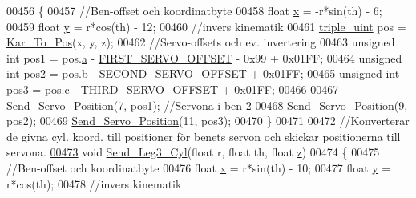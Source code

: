 \begin{DoxyCode}
00456 \{
00457     \textcolor{comment}{//Ben-offset och koordinatbyte}
00458     \textcolor{keywordtype}{float} \hyperlink{sensor_8h_a6c4b361d72eb3767ba424ac9a6ecf52b}{x} = -r*sin(th) - 6;
00459     \textcolor{keywordtype}{float} \hyperlink{sensor_8h_a0ed6a908288e0cd87f79c1b5ab56d07c}{y} = r*cos(th) - 12; 
00460     \textcolor{comment}{//invers kinematik }
00461     \hyperlink{structtriple__uint}{triple\_uint} pos = \hyperlink{invers__kinematik_8c_a68f82386196ad991ed54fb9796d90f7c}{Kar\_To\_Pos}(x, y, z);
00462     \textcolor{comment}{//Servo-offsets och ev. invertering }
00463     \textcolor{keywordtype}{unsigned} \textcolor{keywordtype}{int} pos1 = pos.\hyperlink{structtriple__uint_a0ea8a85723620c90be9fd2a693f12a59}{a} - \hyperlink{servo___u_a_r_t_8c_a4c437d01d2f060ec86c16ed5e76efe45}{FIRST\_SERVO\_OFFSET} - 0x99 + 0x01FF;
00464     \textcolor{keywordtype}{unsigned} \textcolor{keywordtype}{int} pos2 = pos.\hyperlink{structtriple__uint_a790d5baa17ec7aaf7bb49750a16e9c29}{b} - \hyperlink{servo___u_a_r_t_8c_acb02dedbe5ff19694bdb5b2ddf61664a}{SECOND\_SERVO\_OFFSET} + 0x01FF;
00465     \textcolor{keywordtype}{unsigned} \textcolor{keywordtype}{int} pos3 = pos.\hyperlink{structtriple__uint_a6ce17b018c47d0f1d0e53a458f741ad3}{c} - \hyperlink{servo___u_a_r_t_8c_ac2f065c44b617c91ea7f4237e8ead729}{THIRD\_SERVO\_OFFSET} + 0x01FF;
00466     
00467     \hyperlink{servo___u_a_r_t_8c_a5ed0e49737d1eaf80665c285396b4337}{Send\_Servo\_Position}(7, pos1); \textcolor{comment}{//Servona i ben 2}
00468     \hyperlink{servo___u_a_r_t_8c_a5ed0e49737d1eaf80665c285396b4337}{Send\_Servo\_Position}(9, pos2);
00469     \hyperlink{servo___u_a_r_t_8c_a5ed0e49737d1eaf80665c285396b4337}{Send\_Servo\_Position}(11, pos3);
00470 \}
00471 
00472 \textcolor{comment}{//Konverterar de givna cyl. koord. till positioner för benets servon och skickar positionerna till servona.}
\hypertarget{servo___u_a_r_t_8c_source.tex_l00473}{}\hyperlink{servo___u_a_r_t_8h_ae482cf70fc4b70fe8f4201eeffc54f51}{00473} \textcolor{keywordtype}{void} \hyperlink{servo___u_a_r_t_8c_a5d263402be208052fd7cab65ed4809e0}{Send\_Leg3\_Cyl}(\textcolor{keywordtype}{float} r, \textcolor{keywordtype}{float} th, \textcolor{keywordtype}{float} \hyperlink{over__hinder_8c_af73583b1e980b0aa03f9884812e9fd4d}{z})
00474 \{
00475     \textcolor{comment}{//Ben-offset och koordinatbyte}
00476     \textcolor{keywordtype}{float} \hyperlink{sensor_8h_a6c4b361d72eb3767ba424ac9a6ecf52b}{x} = r*sin(th) - 10; 
00477     \textcolor{keywordtype}{float} \hyperlink{sensor_8h_a0ed6a908288e0cd87f79c1b5ab56d07c}{y} = r*cos(th);
00478     \textcolor{comment}{//invers kinematik }

\end{DoxyCode}
